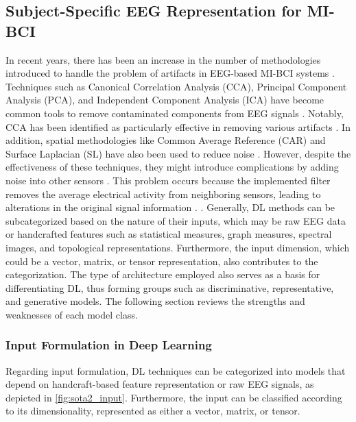 \subsection{Subject-Specific EEG Representation for MI-BCI \label{sec:sota2}}

In recent years, there has been an increase in the number of methodologies introduced to handle the problem of artifacts in EEG-based MI-BCI systems \cite{kotte2020methods}. Techniques such as Canonical Correlation Analysis (CCA), Principal Component Analysis (PCA), and Independent Component Analysis (ICA) have become common tools to remove contaminated components from EEG signals \cite{stergiadis2022bss}. Notably, CCA has been identified as particularly effective in removing various artifacts \cite{rashid2020current,lahane2019review}. In addition, spatial methodologies like Common Average Reference (CAR) and Surface Laplacian (SL) have also been used to reduce noise \cite{uribe2019correntropy}. However, despite the effectiveness of these techniques, they might introduce complications by adding noise into other sensors \cite{mridha2021brain}. This problem occurs because the implemented filter removes the average electrical activity from neighboring sensors, leading to alterations in the original signal information \cite{xu2018wavelet}. . Generally, DL methods can be subcategorized based on the nature of their inputs, which may be raw EEG data or handcrafted features such as statistical measures, graph measures, spectral images, and topological representations. Furthermore, the input dimension, which could be a vector, matrix, or tensor representation, also contributes to the categorization. The type of architecture employed also serves as a basis for differentiating DL, thus forming groups such as discriminative, representative, and generative models. The following section reviews the strengths and weaknesses of each model class.

\subsubsection{Input Formulation in Deep Learning}

Regarding input formulation, DL techniques can be categorized into models that depend on handcraft-based feature representation or raw EEG signals, as depicted in \cref{fig:sota2_input}. Furthermore, the input can be classified according to its dimensionality, represented as either a vector, matrix, or tensor.

